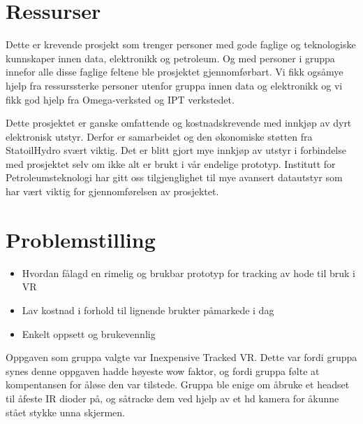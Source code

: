 \section{Ressurser}

	Dette er krevende prosjekt som trenger personer med gode faglige og teknologiske kunnskaper innen data, elektronikk og petroleum. Og med personer i gruppa innefor alle disse faglige feltene ble prosjektet gjennomf\o rbart. Vi fikk ogs\aa \space mye hjelp fra ressurssterke personer utenfor gruppa innen data og elektronikk og vi fikk god hjelp fra Omega-verksted og IPT verkstedet.
	
	Dette prosjektet er ganske omfattende og kostnadskrevende med innkj\o p av dyrt elektronisk utstyr. Derfor er samarbeidet og den \o konomiske st\o tten fra StatoilHydro sv\ae rt viktig. Det er blitt gjort mye innkj\o p av utstyr i forbindelse med prosjektet selv om ikke alt er brukt i v\aa r endelige prototyp. Institutt for Petroleumsteknologi har gitt oss tilgjenglighet til mye avansert datautstyr som har v\ae rt viktig for gjennomf\o relsen av prosjektet.


\section{Problemstilling}

	\begin{itemize}
		\item Hvordan f\aa lagd en rimelig og brukbar prototyp for tracking av hode til bruk i VR
		\item Lav kostnad i forhold til lignende brukter p\aa markede i dag
		\item Enkelt oppsett og brukevennlig
	\end{itemize}
	
	Oppgaven som gruppa valgte var Inexpensive Tracked VR. Dette var fordi gruppa synes denne oppgaven hadde h\o yeste wow faktor, og fordi gruppa f\o lte at kompentansen for \aa \space l\o se den var tilstede. Gruppa ble enige om \aa \space bruke et headset til \aa \space feste IR dioder p\aa , og s\aa \space tracke dem ved hjelp av et hd kamera for \aa \space kunne st\aa et stykke unna skjermen.
